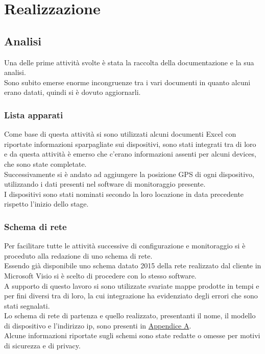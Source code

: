 \documentclass[Tesi.tex]{subfiles}
\begin{document}
\chapter{Realizzazione}

\section{Analisi}

Una delle prime attività svolte è stata la raccolta della documentazione e la sua analisi. \\
Sono subito emerse enorme incongruenze tra i vari documenti in quanto alcuni erano datati, quindi si è dovuto aggiornarli. \\

\subsection{Lista apparati}
Come base di questa attività si sono utilizzati alcuni documenti Excel con riportate informazioni sparpagliate sui dispositivi, sono stati integrati tra di loro e da questa attività è emerso che c'erano informazioni assenti per alcuni devices, che sono state completate. \\
Successivamente si è andato ad aggiungere la posizione GPS di ogni dispositivo, utilizzando i dati presenti nel software di monitoraggio presente. \\
I dispositivi sono stati nominati secondo la loro locazione in data precedente rispetto l'inizio dello stage. \\

\subsection{Schema di rete}
Per facilitare tutte le attività successive di configurazione e monitoraggio si è proceduto alla redazione di uno schema di rete. \\
Essendo già disponibile uno schema datato 2015 della rete realizzato dal cliente in Microsoft Visio si è scelto di procedere con lo stesso software. \\
A supporto di questo lavoro si sono utilizzate svariate mappe prodotte in tempi e per fini diversi tra di loro, la cui integrazione ha evidenziato degli errori che sono stati segnalati. \\
Lo schema di rete di partenza e quello realizzato, presentanti il nome, il modello di dispositivo e l'indirizzo ip, sono presenti in \hyperref[sec:Appendice A]{Appendice A}.\\
Alcune informazioni riportate sugli schemi sono state redatte o omesse per motivi di sicurezza e di privacy. \\
\end{document}
